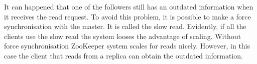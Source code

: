 It can happened that one of the followers still has an outdated information when it receives the read request.
To avoid this problem, it is possible to make a force synchronisation with the master.
It is called the slow read.
Evidently, if all the clients use the slow read the system looses the advantage of scaling.
Without force synchronisation ZooKeeper system scales for reads nicely. 
However, in this case the client that reads from a replica can obtain the outdated information.
 

